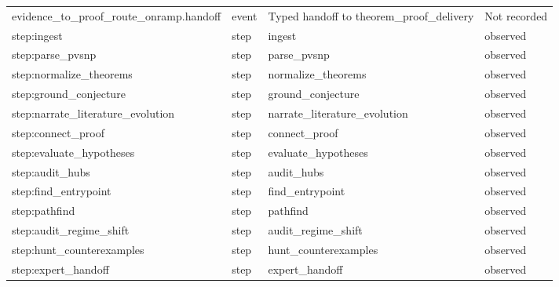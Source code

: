 \documentclass[10pt,a4paper]{article}
\begin{document}
\begin{longtable}{@{}>{\raggedright\arraybackslash}p{.22\linewidth}>{\raggedright\arraybackslash}p{.10\linewidth}>{\raggedright\arraybackslash}p{.38\linewidth}>{\raggedright\arraybackslash}p{.12\linewidth}@{}}
evidence\_\allowbreak{}to\_\allowbreak{}proof\_\allowbreak{}route\_\allowbreak{}onramp.\allowbreak{}handoff & event & Typed handoff to theorem\_\allowbreak{}proof\_\allowbreak{}delivery & Not recorded\\
step:\allowbreak{}ingest & step & ingest & observed\\
step:\allowbreak{}parse\_\allowbreak{}pvsnp & step & parse\_\allowbreak{}pvsnp & observed\\
step:\allowbreak{}normalize\_\allowbreak{}theorems & step & normalize\_\allowbreak{}theorems & observed\\
step:\allowbreak{}ground\_\allowbreak{}conjecture\allowbreak{} & step & ground\_\allowbreak{}conjecture\allowbreak{} & observed\\
step:\allowbreak{}narrate\_\allowbreak{}literature\allowbreak{}\_\allowbreak{}evolution & step & narrate\_\allowbreak{}literature\allowbreak{}\_\allowbreak{}evolution & observed\\
step:\allowbreak{}connect\_\allowbreak{}proof & step & connect\_\allowbreak{}proof & observed\\
step:\allowbreak{}evaluate\_\allowbreak{}hypotheses\allowbreak{} & step & evaluate\_\allowbreak{}hypotheses\allowbreak{} & observed\\
step:\allowbreak{}audit\_\allowbreak{}hubs & step & audit\_\allowbreak{}hubs & observed\\
step:\allowbreak{}find\_\allowbreak{}entrypoint\allowbreak{} & step & find\_\allowbreak{}entrypoint\allowbreak{} & observed\\
step:\allowbreak{}pathfind & step & pathfind & observed\\
step:\allowbreak{}audit\_\allowbreak{}regime\_\allowbreak{}shift & step & audit\_\allowbreak{}regime\_\allowbreak{}shift & observed\\
step:\allowbreak{}hunt\_\allowbreak{}counterexa\allowbreak{}mples & step & hunt\_\allowbreak{}counterexa\allowbreak{}mples & observed\\
step:\allowbreak{}expert\_\allowbreak{}handoff & step & expert\_\allowbreak{}handoff & observed\\
\bottomrule
\end{longtable}
\normalsize\endgroup
\end{document}
